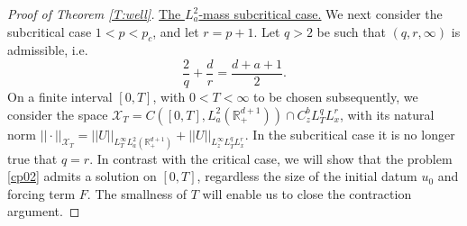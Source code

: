 \documentclass[11pt,letter]{amsart}
\def \RN {\mathbb{R}_+^{d+1}}
\numberwithin{equation}{section}
\newcommand{\XT}{\mathcal{X}_T}
\numberwithin{equation}{section}
\begin{document}
\begin{proof}[Proof of Theorem \ref{T:well}]
\vskip 0.2in 

\noindent \underline{The $L^2_a$-mass subcritical case.} 
We next consider the subcritical case $1<p<p_c$, and let $r = p+1$. Let $q>2$ be such that $(q,r,\infty)$ is admissible, i.e.
\[
\frac 2q +\frac dr = \frac{d+a+1}2.
\]
On a finite interval $[0,T]$, with $0<T<\infty$ to be chosen subsequently, we consider the space $\XT= C([0,T],L^2_a(\RN)) \cap C^{b}_z L^q_T L^r_x$, 
with its natural norm $||\cdot||_{\XT} = ||U||_{L^\infty_T L^2_a(\RN)} + ||U||_{L^\infty_z L^q_TL^r_x }$.
In the subcritical case it is no longer true that $q =r$. In contrast with the critical case, we will show that the problem \eqref{cp02} admits a solution on $[0,T]$, regardless the size of the initial datum $u_0$ and forcing term $F$. The smallness of $T$ will enable us to close the contraction argument. 


\end{proof}
\end{document}
